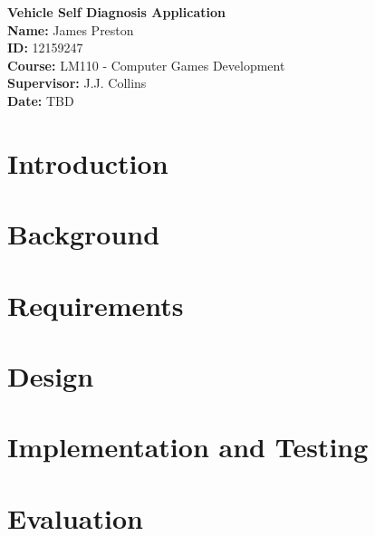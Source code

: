 \documentclass[12pt]{report}
\begin{document}
\begin{titlepage}
	\begin{center}		
		\vspace*{5cm}
		\textbf{\LARGE{Vehicle Self Diagnosis Application}}\\
		\vspace{5cm}		
		\textbf{Name:} James Preston\\
		\textbf{ID:} 12159247\\
		\textbf{Course:} LM110 - Computer Games Development\\
		\textbf{Supervisor:} J.J. Collins\\
		\textbf{Date:} TBD\\

	\end{center}
\end{titlepage}

	\tableofcontents
	\newpage
	
	\chapter{Introduction}
		
	\newpage 
	
	\chapter{Background}
		
	\newpage

	\chapter{Requirements}
		
	\newpage	

	\chapter{Design}
		
	\newpage
	
	\chapter{Implementation and Testing}
		
	\newpage
	
	\chapter{Evaluation}
	
	\newpage
	
\end{document}
